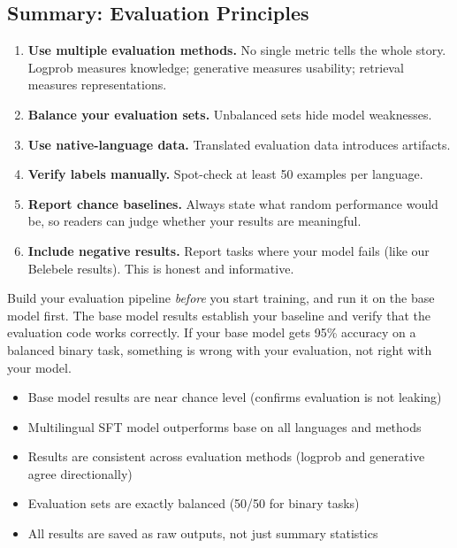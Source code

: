 \documentclass[11pt,a4paper]{article}
\begin{document}
\subsection{Summary: Evaluation Principles}

\begin{enumerate}
    \item \textbf{Use multiple evaluation methods.} No single metric tells the whole story. Logprob measures knowledge; generative measures usability; retrieval measures representations.
    \item \textbf{Balance your evaluation sets.} Unbalanced sets hide model weaknesses.
    \item \textbf{Use native-language data.} Translated evaluation data introduces artifacts.
    \item \textbf{Verify labels manually.} Spot-check at least 50 examples per language.
    \item \textbf{Report chance baselines.} Always state what random performance would be, so readers can judge whether your results are meaningful.
    \item \textbf{Include negative results.} Report tasks where your model fails (like our Belebele results). This is honest and informative.
\end{enumerate}

\begin{tip}
Build your evaluation pipeline \emph{before} you start training, and run it on the base model first. The base model results establish your baseline and verify that the evaluation code works correctly. If your base model gets 95\% accuracy on a balanced binary task, something is wrong with your evaluation, not right with your model.
\end{tip}

\begin{successcheck}
\begin{itemize}[nosep]
  \item Base model results are near chance level (confirms evaluation is not leaking)
  \item Multilingual SFT model outperforms base on all languages and methods
  \item Results are consistent across evaluation methods (logprob and generative agree directionally)
  \item Evaluation sets are exactly balanced (50/50 for binary tasks)
  \item All results are saved as raw outputs, not just summary statistics
\end{itemize}
\end{successcheck}
\end{document}
